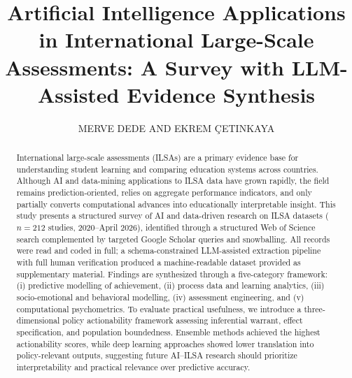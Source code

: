\documentclass{ieeeaccess}
\begin{document}

\title{Artificial Intelligence Applications in International Large-Scale Assessments: \newline A Survey with LLM-Assisted Evidence Synthesis}
\author{\uppercase{Merve Dede} AND
\uppercase{Ekrem \c{C}etinkaya}  }

\address[1]{Department of Artificial Intelligence and Machine Learning, 
Istanbul Beykent University, Istanbul, Türkiye
}
\address[2]{Department of Artificial Intelligence and Data Engineering, Yıldız Technical University, Istanbul, Türkiye (e-mail: ekrem.cetinkaya@yildiz.edu.tr)}



\begin{abstract}
International large-scale assessments (ILSAs) are a primary evidence base for understanding student learning and comparing education systems across countries. Although AI and data-mining applications to ILSA data have grown rapidly, the field remains prediction-oriented, relies on aggregate performance indicators, and only partially converts computational advances into educationally interpretable insight. This study presents a structured survey of AI and data-driven research on ILSA datasets ($n = 212$ studies, 2020--April 2026), identified through a structured Web of Science search complemented by targeted Google Scholar queries and snowballing. All records were read and coded in full; a schema-constrained LLM-assisted extraction pipeline with full human verification produced a machine-readable dataset provided as supplementary material. Findings are synthesized through a five-category framework: (i) predictive modelling of achievement, (ii) process data and learning analytics, (iii) socio-emotional and behavioral modelling, (iv) assessment engineering, and (v) computational psychometrics. To evaluate practical usefulness, we introduce a three-dimensional policy actionability framework assessing inferential warrant, effect specification, and population boundedness. Ensemble methods achieved the highest actionability scores, while deep learning approaches showed lower translation into policy-relevant outputs, suggesting future AI--ILSA research should prioritize interpretability and practical relevance over predictive accuracy.
\end{abstract}
\end{document}
